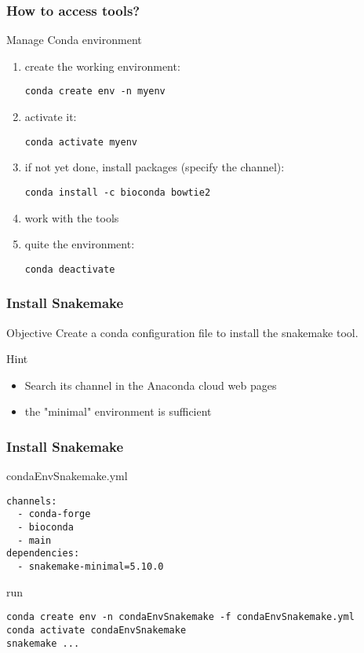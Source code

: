 \begin{frame}[containsverbatim]
\frametitle{How to access tools?}
\begin{exampleblock}{Manage Conda environment}
\begin{enumerate}
    \item create the working environment:
\begin{lstlisting}
conda create env -n myenv
\end{lstlisting}
    \item activate it: 
\begin{lstlisting}
conda activate myenv
\end{lstlisting}
    \item if not yet done, install packages (specify the channel): 
\begin{lstlisting}
conda install -c bioconda bowtie2
\end{lstlisting}
    \item work with the tools
    \item quite the environment: 
\begin{lstlisting}
conda deactivate
\end{lstlisting}
\end{enumerate}
\end{exampleblock}
\end{frame}
\begin{frame}[containsverbatim]
\frametitle{Install Snakemake}
\begin{exampleblock}{Objective}
Create a conda configuration file to install the snakemake tool.
\end{exampleblock}
\begin{exampleblock}{Hint}
\begin{itemize}
    \item Search its channel in the Anaconda cloud web pages
    \item the "minimal" environment is sufficient
\end{itemize}
\end{exampleblock}
\end{frame}
\begin{frame}[containsverbatim]
\frametitle{Install Snakemake}
\begin{exampleblock}{condaEnvSnakemake.yml}
\begin{lstlisting}
channels:
  - conda-forge
  - bioconda
  - main
dependencies:
  - snakemake-minimal=5.10.0
\end{lstlisting}
\end{exampleblock}
\begin{exampleblock}{run}
\begin{lstlisting}
conda create env -n condaEnvSnakemake -f condaEnvSnakemake.yml
conda activate condaEnvSnakemake
snakemake ...
\end{lstlisting}
\end{exampleblock}
\end{frame}